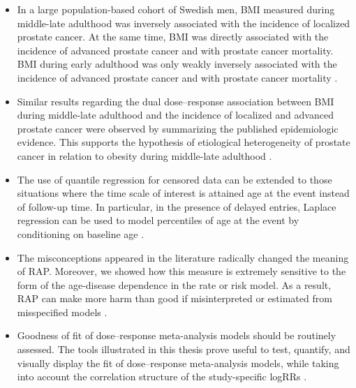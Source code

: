 \begin{itemize}

\item In a large population-based cohort of Swedish men, BMI measured during middle-late adulthood was inversely associated with the incidence of  localized prostate cancer. At the same time, BMI was directly associated with the incidence of advanced prostate cancer and with prostate cancer mortality. BMI during early adulthood was only weakly inversely associated with the incidence of advanced prostate cancer and with prostate cancer mortality .

\item Similar results regarding the dual dose--response association between BMI during middle-late adulthood and the incidence of localized and advanced prostate cancer were observed by summarizing the published epidemiologic evidence. This supports the hypothesis of etiological heterogeneity of prostate cancer in relation to obesity during middle-late adulthood .

\item The use of quantile regression for censored data can be extended to those situations where the time scale of interest is attained age at the event instead of follow-up time. In particular, in the presence of delayed entries, Laplace regression can be used to model percentiles of age at the event by conditioning on baseline age .

\item The misconceptions appeared in the literature radically changed the meaning of RAP. Moreover, we showed how this measure is extremely sensitive to the form of the age-disease dependence in the rate or risk model. As a result, RAP can make more harm than good if misinterpreted or estimated from misspecified models . 

\item Goodness of fit of dose--response meta-analysis models should be routinely assessed. The tools illustrated in this thesis prove useful to test, quantify, and visually display the fit of dose–response meta-analysis models, while taking into account the correlation structure of the study-specific logRRs .

\end{itemize}